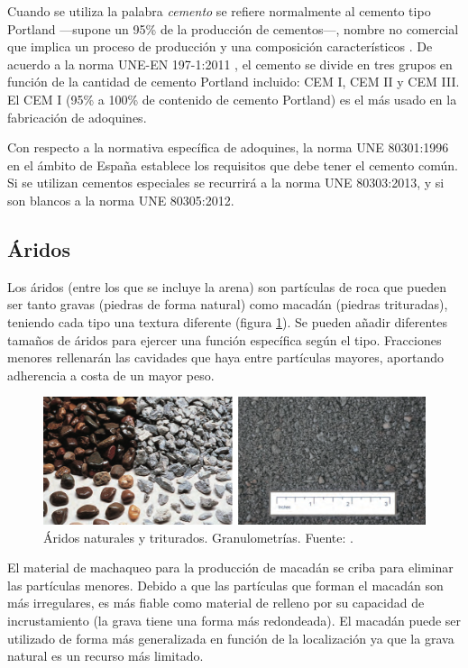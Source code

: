 Cuando se utiliza la palabra \emph{cemento} se refiere normalmente al cemento tipo Portland —supone un 95\% de la producción de cementos—, nombre no comercial que implica un proceso de producción y una composición característicos \cite{jsjunnesson}. De acuerdo a la norma UNE-EN 197-1:2011 \cite{une1971}, el cemento se divide en tres grupos en función de la cantidad de cemento Portland incluido: CEM I, CEM II y CEM III. El CEM I (95\% a 100\% de contenido de cemento Portland) es el más usado en la fabricación de adoquines.

Con respecto a la normativa específica de adoquines, la norma UNE 80301:1996 \cite{une80301} en el ámbito de España establece los requisitos que debe tener el cemento común. Si se utilizan cementos especiales se recurrirá a la norma UNE 80303:2013, y si son blancos a la norma UNE 80305:2012.

\subsection{Áridos}
Los áridos (entre los que se incluye la arena) son partículas de roca que pueden ser tanto gravas (piedras de forma natural) como macadán (piedras trituradas), teniendo cada tipo una textura diferente (figura \ref{fig:aridosnaturalesytriturados}). Se pueden añadir diferentes tamaños de áridos para ejercer una función específica según el tipo. Fracciones menores rellenarán las cavidades que haya entre partículas mayores, aportando adherencia a costa de un mayor peso.

\begin{figure}[!htb]
\centering
\includegraphics[width=13cm]{img/aridos.png}
\caption[Áridos naturales y triturados. Granulometrías.]{Áridos naturales y triturados. Granulometrías. Fuente: \cite{sustpave}.}
\label{fig:aridosnaturalesytriturados}
\end{figure}

El material de machaqueo para la producción de macadán se criba para eliminar las partículas menores. Debido a que las partículas que forman el macadán son más irregulares, es más fiable como material de relleno por su capacidad de incrustamiento (la grava tiene una forma más redondeada). El macadán puede ser utilizado de forma más generalizada en función de la localización ya que la grava natural es un recurso más limitado.

